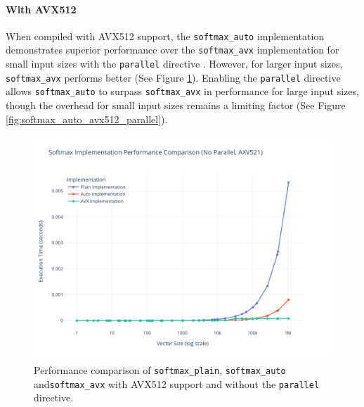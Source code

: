 \documentclass[10pt]{article}
\begin{document}
\paragraph{With AVX512} When compiled with AVX512 support, the \texttt{softmax\_auto} implementation demonstrates superior performance over the \texttt{softmax\_avx} implementation for small input sizes with the \texttt{parallel} directive . However, for larger input sizes, \texttt{softmax\_avx} performs better (See Figure \ref{fig:softmax_auto_avx512_no_parallel}). Enabling the \texttt{parallel} directive allows \texttt{softmax\_auto} to surpass \texttt{softmax\_avx} in performance for large input sizes, though the overhead for small input sizes remains a limiting factor (See Figure \ref{fig:softmax_auto_avx512_parallel}).

\begin{figure}[h!]
  \centering
  \includegraphics[width=\textwidth]{../images/softmax_noparallel_axv521.pdf}
  \caption{Performance comparison of \texttt{softmax\_plain}, \texttt{softmax\_auto} and\texttt{softmax\_avx} with AVX512 support and without the \texttt{parallel} directive.}
  \label{fig:softmax_auto_avx512_no_parallel}
\end{figure}
\end{document}

